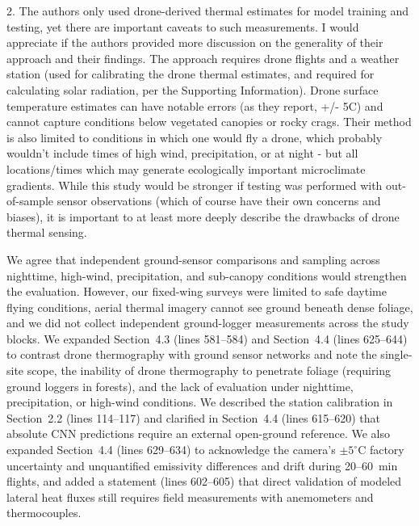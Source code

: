 \documentclass[12pt,english]{reviewresponse}
\begin{document}
\begin{revcomment}
2. The authors only used drone-derived thermal estimates for model training and testing, yet there are important caveats to such measurements. I would appreciate if the authors provided more discussion on the generality of their approach and their findings. The approach requires drone flights and a weather station (used for calibrating the drone thermal estimates, and required for calculating solar radiation, per the Supporting Information). Drone surface temperature estimates can have notable errors (as they report, +/- 5C) and cannot capture conditions below vegetated canopies or rocky crags. Their method is also limited to conditions in which one would fly a drone, which probably wouldn't include times of high wind, precipitation, or at night - but all locations/times which may generate ecologically important microclimate gradients. While this study would be stronger if testing was performed with out-of-sample sensor observations (which of course have their own concerns and biases), it is important to at least more deeply describe the drawbacks of drone thermal sensing.
\end{revcomment}

\begin{revresponse}
We agree that independent ground-sensor comparisons and sampling across nighttime, high-wind, precipitation, and sub-canopy conditions would strengthen the evaluation. However, our fixed-wing surveys were limited to safe daytime flying conditions, aerial thermal imagery cannot see ground beneath dense foliage, and we did not collect independent ground-logger measurements across the study blocks. We expanded Section~4.3 (lines 581--584) and Section~4.4 (lines 625--644) to contrast drone thermography with ground sensor networks and note the single-site scope, the inability of drone thermography to penetrate foliage (requiring ground loggers in forests), and the lack of evaluation under nighttime, precipitation, or high-wind conditions. We described the station calibration in Section~2.2 (lines 114--117) and clarified in Section~4.4 (lines 615--620) that absolute CNN predictions require an external open-ground reference. We also expanded Section~4.4 (lines 629--634) to acknowledge the camera's $\pm 5^\circ$C factory uncertainty and unquantified emissivity differences and drift during 20--60~min flights, and added a statement (lines 602--605) that direct validation of modeled lateral heat fluxes still requires field measurements with anemometers and thermocouples.
\end{revresponse}
\end{document}
